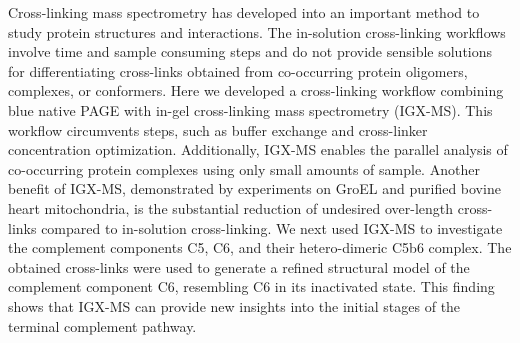 \begin{abstract102}
    Cross-linking mass spectrometry has developed into an important method to study protein structures and interactions. The in-solution cross-linking workflows involve time and sample consuming steps and do not provide sensible solutions for differentiating cross-links obtained from co-occurring protein oligomers, complexes, or conformers. Here we developed a cross-linking workflow combining blue native PAGE with in-gel cross-linking mass spectrometry (IGX-MS). This workflow circumvents steps, such as buffer exchange and cross-linker concentration optimization. Additionally, IGX-MS enables the parallel analysis of co-occurring protein complexes using only small amounts of sample. Another benefit of IGX-MS, demonstrated by experiments on GroEL and purified bovine heart mitochondria, is the substantial reduction of undesired over-length cross-links compared to in-solution cross-linking. We next used IGX-MS to investigate the complement components C5, C6, and their hetero-dimeric C5b6 complex. The obtained cross-links were used to generate a refined structural model of the complement component C6, resembling C6 in its inactivated state. This finding shows that IGX-MS can provide new insights into the initial stages of the terminal complement pathway.
\end{abstract102}
%
\thumbforchapter
